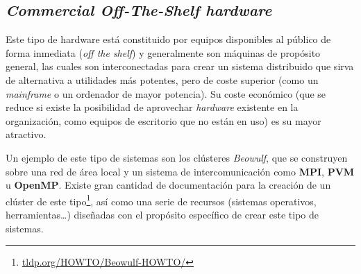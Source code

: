 \subsection{\textit{Commercial Off-The-Shelf hardware}}

Este tipo de hardware está constituido por equipos disponibles al público de forma inmediata (\textit{off the shelf}) y generalmente son máquinas de propósito general, las cuales son interconectadas para crear un sistema distribuido que sirva de alternativa a utilidades más potentes, pero de coste superior (como un \textit{mainframe} o un ordenador de mayor potencia). Su coste económico (que se reduce si existe la posibilidad de aprovechar \textit{hardware} existente en la organización, como equipos de escritorio que no están en uso) es su mayor atractivo.

Un ejemplo de este tipo de sistemas son los clústeres \textit{Beowulf}\cite{beowulf:icpp95}, que se construyen sobre una red de área local y un sistema de intercomunicación como \textbf{MPI}, \textbf{PVM} u \textbf{OpenMP}. Existe gran cantidad de documentación para la creación de un clúster de este tipo\footnote{\href{http://tldp.org/HOWTO/Beowulf-HOWTO/}{tldp.org/HOWTO/Beowulf-HOWTO/}}, así como una serie de recursos (sistemas operativos, herramientas\dots) diseñadas con el propósito específico de crear este tipo de sistemas.
